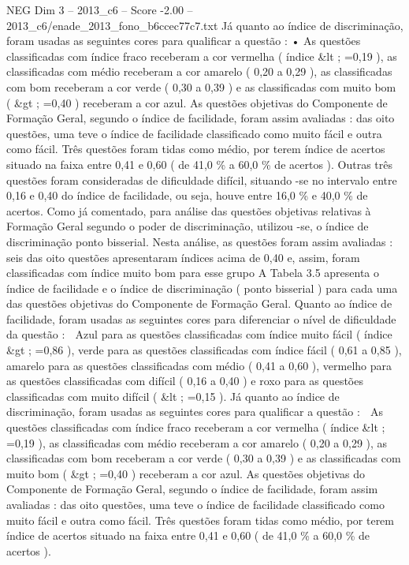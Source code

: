 \begin{textsample}{NEG Dim 3 – 2013\_c6 – Score -2.00 – 2013\_c6/enade\_2013\_fono\_b6ccec77c7.txt}
Já quanto ao índice de discriminação, foram usadas as seguintes cores para qualificar a questão : • As questões classificadas com índice fraco receberam a cor vermelha ( índice \&lt ; =0,19 ), as classificadas com médio receberam a cor amarelo ( 0,20 a 0,29 ), as classificadas com bom receberam a cor verde ( 0,30 a 0,39 ) e as classificadas com muito bom ( \&gt ; =0,40 ) receberam a cor azul.
As questões objetivas do Componente de Formação Geral, segundo o índice de facilidade, foram assim avaliadas : das oito questões, uma teve o índice de facilidade classificado como muito fácil e outra como fácil.
Três questões foram tidas como médio, por terem índice de acertos situado na faixa entre 0,41 e 0,60 ( de 41,0 \% a 60,0 \% de acertos ).
Outras três questões foram consideradas de dificuldade difícil, situando -se no intervalo entre 0,16 e 0,40 do índice de facilidade, ou seja, houve entre 16,0 \% e 40,0 \% de acertos.
Como já comentado, para análise das questões objetivas relativas à Formação Geral segundo o poder de discriminação, utilizou -se, o índice de discriminação ponto bisserial.
Nesta análise, as questões foram assim avaliadas : seis das oito questões apresentaram índices acima de 0,40 e, assim, foram classificadas com índice muito bom para esse grupo A Tabela 3.5 apresenta o índice de facilidade e o índice de discriminação ( ponto bisserial ) para cada uma das questões objetivas do Componente de Formação Geral.
Quanto ao índice de facilidade, foram usadas as seguintes cores para diferenciar o nível de dificuldade da questão :  Azul para as questões classificadas com índice muito fácil ( índice \&gt ; =0,86 ), verde para as questões classificadas com índice fácil ( 0,61 a 0,85 ), amarelo para as questões classificadas com médio ( 0,41 a 0,60 ), vermelho para as questões classificadas com difícil ( 0,16 a 0,40 ) e roxo para as questões classificadas com muito difícil ( \&lt ; =0,15 ).
Já quanto ao índice de discriminação, foram usadas as seguintes cores para qualificar a questão :  As questões classificadas com índice fraco receberam a cor vermelha ( índice \&lt ; =0,19 ), as classificadas com médio receberam a cor amarelo ( 0,20 a 0,29 ), as classificadas com bom receberam a cor verde ( 0,30 a 0,39 ) e as classificadas com muito bom ( \&gt ; =0,40 ) receberam a cor azul.
As questões objetivas do Componente de Formação Geral, segundo o índice de facilidade, foram assim avaliadas : das oito questões, uma teve o índice de facilidade classificado como muito fácil e outra como fácil.
Três questões foram tidas como médio, por terem índice de acertos situado na faixa entre 0,41 e 0,60 ( de 41,0 \% a 60,0 \% de acertos ).

\end{textsample}
